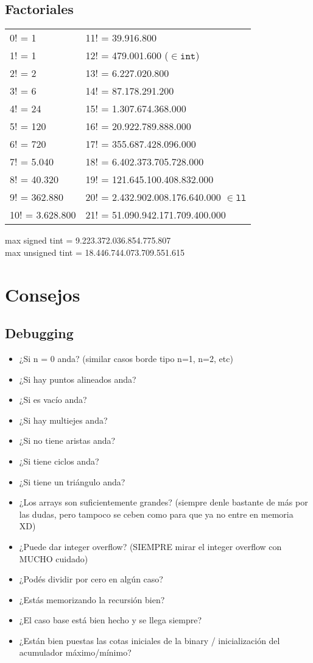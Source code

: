 \documentclass{article}
\begin{document}
\begin{multicols*}{2}
\subsection{Factoriales}
\begin{tabular}{l|l}
0! =	1             & 11! = 39.916.800  \\
1! =	1             & 12! =	479.001.600	($\in \mathtt{int}$)\\
2! =	2             & 13! =	6.227.020.800	\\
3! =	6             & 14! =	87.178.291.200	\\
4! =	24            & 15! =	1.307.674.368.000	\\
5! =	120   			  & 16! =	20.922.789.888.000	\\
6! =	720           & 17! =	355.687.428.096.000	\\
7! =	5.040	        & 18! =	6.402.373.705.728.000	\\
8! =	40.320	      & 19! =	121.645.100.408.832.000	\\
9! =	362.880       & 20! =	2.432.902.008.176.640.000 $\in \mathtt{ll}$ \\
10! =	3.628.800     & 21! =	51.090.942.171.709.400.000
\end{tabular}

max signed tint = 9.223.372.036.854.775.807 \\
max unsigned tint = 18.446.744.073.709.551.615


\section{Consejos}
\subsection{Debugging}
\begin{itemize}
    \itemsep0em
\item ¿Si n = 0 anda? (similar casos borde tipo n=1, n=2, etc)
\item ¿Si hay puntos alineados anda?
\item ¿Si es vacío anda?
\item ¿Si hay multiejes anda?
\item ¿Si no tiene aristas anda?
\item ¿Si tiene ciclos anda?
\item ¿Si tiene un triángulo anda?

\item ¿Los arrays son suficientemente grandes? (siempre denle bastante de más por las dudas, pero tampoco se ceben como para que ya no entre en memoria XD)
\item ¿Puede dar integer overflow? (SIEMPRE mirar el integer overflow con MUCHO cuidado)
\item ¿Podés dividir por cero en algún caso?
\item ¿Estás memorizando la recursión bien?
\item ¿El caso base está bien hecho y se llega siempre?
\item ¿Están bien puestas las cotas iniciales de la binary / inicialización del acumulador máximo/mínimo?


\end{itemize}
\end{multicols*}
\end{document}
